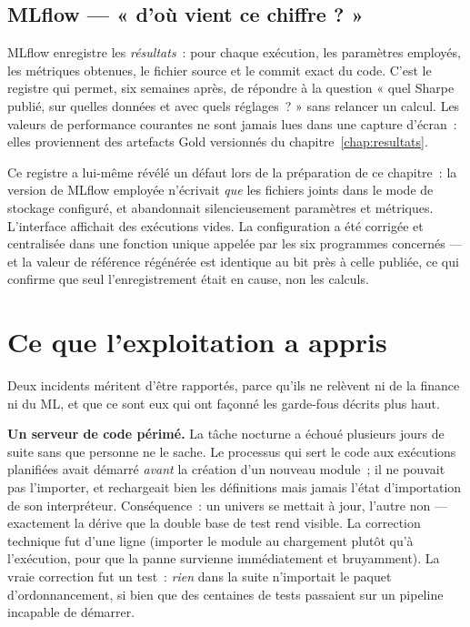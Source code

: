 \subsection{MLflow — « d'où vient ce chiffre ? »}

MLflow enregistre les \emph{résultats}~: pour chaque exécution, les paramètres
employés, les métriques obtenues, le fichier source et le commit exact du code.
C'est le registre qui permet, six semaines après, de répondre à la question
« quel Sharpe publié, sur quelles données et avec quels réglages~? » sans relancer
un calcul. Les valeurs de performance courantes ne sont jamais lues dans une
capture d'écran~: elles proviennent des artefacts Gold versionnés du
chapitre~\ref{chap:resultats}.

\begin{remarquebox}
Ce registre a lui-même révélé un défaut lors de la préparation de ce chapitre~:
la version de MLflow employée n'écrivait \emph{que} les fichiers joints dans le
mode de stockage configuré, et abandonnait silencieusement paramètres et
métriques. L'interface affichait des exécutions vides. La configuration a été
corrigée et centralisée dans une fonction unique appelée par les six programmes
concernés — et la valeur de référence régénérée est identique au bit près à celle
publiée, ce qui confirme que seul l'enregistrement était en cause, non les
calculs.
\end{remarquebox}

\section{Ce que l'exploitation a appris}

Deux incidents méritent d'être rapportés, parce qu'ils ne relèvent ni de la
finance ni du ML, et que ce sont eux qui ont façonné les garde-fous décrits
plus haut.

\textbf{Un serveur de code périmé.} La tâche nocturne a échoué plusieurs jours de
suite sans que personne ne le sache. Le processus qui sert le code aux exécutions
planifiées avait démarré \emph{avant} la création d'un nouveau module~; il ne
pouvait pas l'importer, et rechargeait bien les définitions mais jamais l'état
d'importation de son interpréteur. Conséquence~: un univers se mettait à jour,
l'autre non — exactement la dérive que la double base de test rend visible. La
correction technique fut d'une ligne (importer le module au chargement plutôt
qu'à l'exécution, pour que la panne survienne immédiatement et bruyamment). La
vraie correction fut un test~: \emph{rien} dans la suite n'importait le paquet
d'ordonnancement, si bien que des centaines de tests passaient sur un pipeline
incapable de démarrer.

